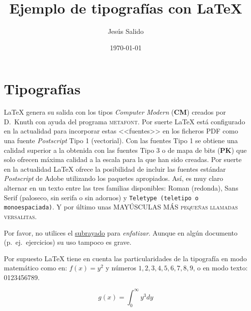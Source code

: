 \documentclass[11pt,a4paper]{article}
\title{Ejemplo de tipografías con \LaTeX}
\author{Jesús Salido}
\date{\today}
\begin{document}
\maketitle


\section{Tipografías}
\LaTeX{} genera su salida con los tipos \emph{Computer Modern} (\textbf{CM}) creados por D.~Knuth con ayuda del programa \textsc{metafont}. Por suerte \LaTeX{} está configurado en la actualidad para incorporar estas <<fuentes>> en los ficheros PDF como una fuente \emph{Postscript} Tipo 1 (vectorial). Con las fuentes Tipo 1 se obtiene una calidad superior a la obtenida con las fuentes Tipo 3 o de mapa de bits (\textbf{PK}) que solo ofrecen máxima calidad a la escala para la que han sido creadas. Por suerte en la actualidad \LaTeX{} ofrece la posibilidad de incluir las fuentes estándar \emph{Postscript} de \textsf{Adobe} utilizando los paquetes apropiados. Así, es muy claro alternar en un texto entre las tres familias disponibles: Roman (redonda), \textsf{Sans Serif (paloseco, sin serifa o sin adornos)} y \texttt{Teletype (teletipo o monoespaciada)}. Y por último unas MAYÚSCULAS MÁS \textsc{pequeñas llamadas versalitas}.

Por favor, no utilices el \underline{subrayado} para \emph{enfatizar}. Aunque en algún documento (p.~ej.\ ejercicios) su uso tampoco es grave.

Por supuesto \LaTeX{} tiene en cuenta las particularidades de la tipografía en modo matemático como en: $f(x)=y^2$ y números $1,2,3,4,5,6,7,8,9$, o en modo texto: 0123456789.

$$g(x)=\int_{0}^{\infty}y^{3}dy$$
\end{document}
